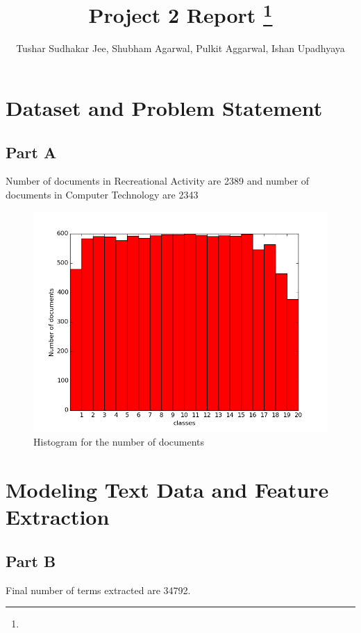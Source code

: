 \documentclass[11pt]{article}
\title{Project 2 Report
\footnote{\s{EE 239AS ; Winter 2016 }
}
}
\author{Tushar Sudhakar Jee, Shubham Agarwal, Pulkit Aggarwal, Ishan Upadhyaya
	}
\begin{document}
\maketitle


\section{Dataset and Problem Statement}
\subsection{Part A}
Number of documents in Recreational Activity are 2389 and number of documents in Computer Technology are 2343\\

\begin{figure}[h]
	\centering
	\includegraphics[scale = 0.5]{histogram.png}
	\caption{Histogram for the number of documents}
\end{figure}

\newpage
\section{Modeling Text Data and Feature Extraction}
\subsection{Part B}
Final number of terms extracted are 34792.
\end{document}
